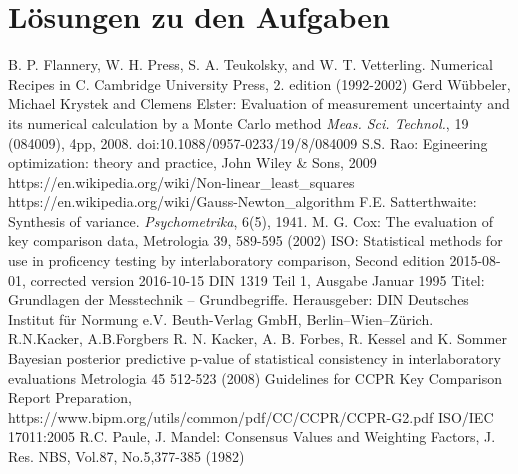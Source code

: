 \documentclass[a4paper,11pt]{book}
\begin{document}
\chapter{Lösungen zu den Aufgaben}




\begin{thebibliography}{------}
     B. P. Flannery, W. H. Press, S. A. Teukolsky, and W. T. Vetterling. Numerical Recipes in C. Cambridge University Press, 2. edition (1992-2002)
     Gerd Wübbeler, Michael Krystek and Clemens Elster: Evaluation of measurement uncertainty
    and its numerical calculation by a Monte Carlo method
    {\em Meas. Sci. Technol.}, 19 (084009), 4pp, 2008.
    doi:10.1088/0957-0233/19/8/084009
     S.S. Rao: Egineering optimization: theory and practice,
    John Wiley \& Sons, 2009
     https://en.wikipedia.org/wiki/Non-linear\_least\_squares
     https://en.wikipedia.org/wiki/Gauss-Newton\_algorithm
         F.E. Satterthwaite: Synthesis of variance.
    {\em Psychometrika}, 6(5), 1941.
	 M. G. Cox: The evaluation of key comparison data, Metrologia 39, 589-595 (2002)
	 ISO: Statistical methods for use in proficency testing by interlaboratory comparison, Second edition 2015-08-01, corrected version 2016-10-15
	 DIN 1319 Teil 1, Ausgabe Januar 1995 Titel: Grundlagen der Messtechnik – Grundbegriffe. Herausgeber: DIN Deutsches Institut für Normung e.V. Beuth-Verlag GmbH, Berlin–Wien–Zürich.
	 R.N.Kacker, A.B.Forgbers
	R. N. Kacker, A. B. Forbes, R. Kessel and K. Sommer Bayesian posterior predictive
	p-value of statistical consistency in interlaboratory evaluations Metrologia 45 512-523 (2008)
	 Guidelines for CCPR Key Comparison Report
	Preparation, https://www.bipm.org/utils/common/pdf/CC/CCPR/CCPR-G2.pdf
	ISO/IEC 17011:2005
	  R.C. Paule, J. Mandel: Consensus Values and Weighting Factors, J. Res. NBS, Vol.87, No.5,377-385 (1982)

\end{thebibliography}
\end{document}
